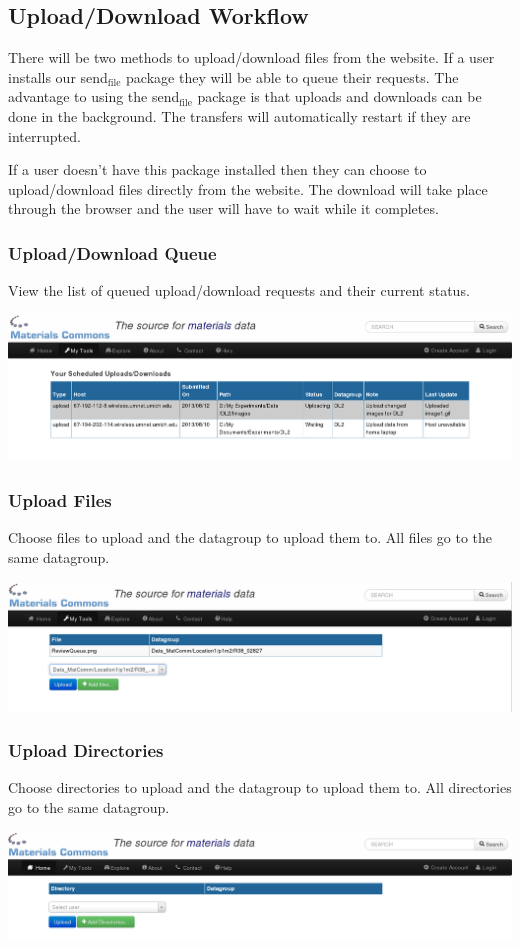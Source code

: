 \documentclass[11pt]{article}
\begin{document}
\subsection{Upload/Download Workflow}
\label{sec-1-2}
There will be two methods to upload/download files from the website. If a user installs
our send$_{\text{file}}$ package they will be able to queue their requests. The advantage to using
the send$_{\text{file}}$ package is that uploads and downloads can be done in the background. The
transfers will automatically restart if they are interrupted.

If a user doesn't have this package installed then they can choose to upload/download
files directly from the website. The download will take place through the browser and
the user will have to wait while it completes.

\subsubsection{Upload/Download Queue}
\label{sec-1-2-1}
View the list of queued upload/download requests and their current status.

\includegraphics[width=.9\linewidth]{ScheduledUploadsDownloads.png}
\subsubsection{Upload Files}
\label{sec-1-2-2}
Choose files to upload and the datagroup to upload them to. All files go to the
same datagroup.

\includegraphics[width=.9\linewidth]{UploadFile.png}
\subsubsection{Upload Directories}
\label{sec-1-2-3}
Choose directories to upload and the datagroup to upload them to. All directories
go to the same datagroup.

\includegraphics[width=.9\linewidth]{UploadDirectories.png}
\end{document}
